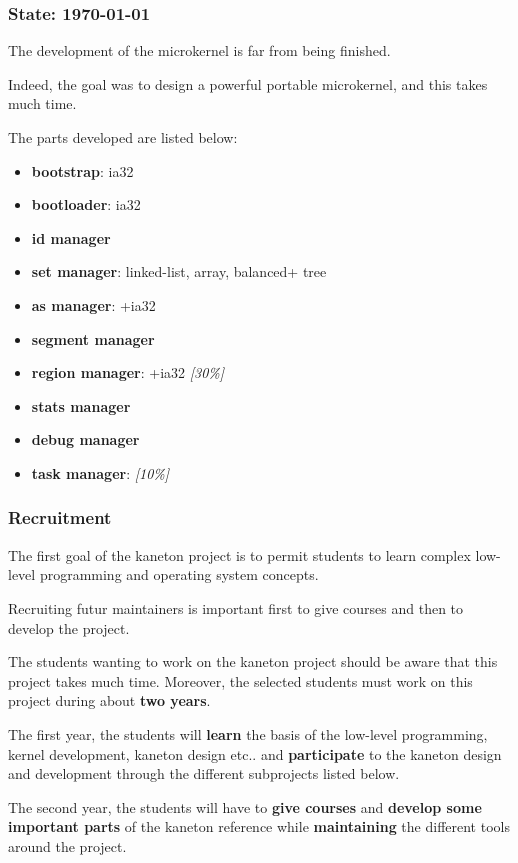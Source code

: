 \begin{frame}
  \frametitle{State: \textbf{\today}}

  The development of the microkernel is far from being finished.

  \nl

  Indeed, the goal was to design a powerful portable microkernel, and this
  takes much time.

  \nl

  The parts developed are listed below:

  \begin{itemize}[<+->]
    \item
      \textbf{bootstrap}: ia32
    \item
      \textbf{bootloader}: ia32
    \item
      \textbf{id manager}
    \item
      \textbf{set manager}: linked-list, array, balanced+ tree
    \item
      \textbf{as manager}: +ia32
    \item
      \textbf{segment manager}
    \item
      \textbf{region manager}: +ia32 \textit{[30\%]}
    \item
      \textbf{stats manager}
    \item
      \textbf{debug manager}
    \item
      \textbf{task manager}: \textit{[10\%]}
  \end{itemize}
\end{frame}


\begin{frame}
  \frametitle{Recruitment}

  The first goal of the kaneton project is to permit students to
  learn complex low-level programming and operating system concepts.

  \nl

  Recruiting futur maintainers is important first to give courses
  and then to develop the project.

  \nl

  The students wanting to work on the kaneton project should be aware
  that this project takes much time. Moreover, the selected students
  must work on this project during about \textbf{two years}.

  \nl

  The first year, the students will \textbf{learn} the basis of the low-level
  programming, kernel development, kaneton design etc.. and
  \textbf{participate} to the kaneton design and development through
  the different subprojects listed below.

  \nl

  The second year, the students will have to \textbf{give courses} and
  \textbf{develop some important parts} of the kaneton reference while
  \textbf{maintaining} the different tools around the project.
\end{frame}

